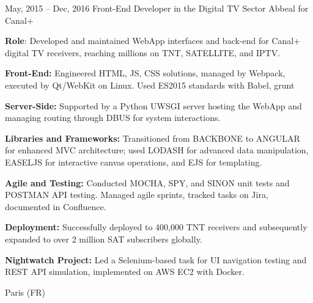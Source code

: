 \documentclass[
  a4paper,
   maincolor=cvblue,
   sectioncolor=cvblue,
   sidebarwidth=0.323\paperwidth,
]{fortysecondscv}
\begin{document}
\begin{cvtableNew}
  \cvitemRightNew
    {May, 2015 – Dec, 2016} %
    {Front-End Developer in the Digital TV Sector} %
    {Abbeal for Canal+} %
    {
      \vspace{-0.4pt} %
      \fontsize{10.8pt}{12pt}\selectfont %
      \textbf{Role}: Developed and maintained WebApp interfaces and back-end for Canal+ digital TV receivers, reaching millions on TNT, SATELLITE, and IPTV.\par
      \vspace{4pt}
      \textbf{Front-End:} Engineered HTML, JS, CSS solutions, managed by Webpack, executed by Qt/WebKit on Linux. Used ES2015 standards with Babel, grunt\par
      \vspace{4pt}
      \textbf{Server-Side:} Supported by a Python UWSGI server hosting the WebApp and managing routing through DBUS for system interactions.\par
      \vspace{4pt}
      \textbf{Libraries and Frameworks:} Transitioned from BACKBONE to ANGULAR for enhanced MVC architecture; used LODASH for advanced data manipulation, EASELJS for interactive canvas operations, and EJS for templating.\par
      \vspace{4pt}
      \textbf{Agile and Testing:} Conducted MOCHA, SPY, and SINON unit tests and POSTMAN API testing. Managed agile sprints, tracked tasks on Jira, documented in Confluence.\par
      \vspace{4pt}
      \textbf{Deployment:} Successfully deployed to 400,000 TNT receivers and subsequently expanded to over 2 million SAT subscribers globally.\par
      \vspace{4pt}
      \textbf{Nightwatch Project:} Led a Selenium-based task for UI navigation testing and REST API simulation, implemented on AWS EC2 with Docker.\par
      \vspace{4pt} %
    }
    {Paris (FR)} %


    \vspace{1.2mm} %


\end{cvtableNew}
\end{document}

